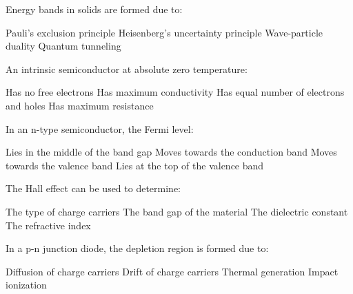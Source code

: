 \begin{question}[2]
Energy bands in solids are formed due to:

\begin{oneparcheckboxes}
\correctchoice Pauli's exclusion principle
\choice Heisenberg's uncertainty principle
\choice Wave-particle duality
\choice Quantum tunneling
\end{oneparcheckboxes}
\end{question}

\begin{question}[2]
An intrinsic semiconductor at absolute zero temperature:

\begin{oneparcheckboxes}
\correctchoice Has no free electrons
\choice Has maximum conductivity
\choice Has equal number of electrons and holes
\choice Has maximum resistance
\end{oneparcheckboxes}
\end{question}

\begin{question}[2]
In an n-type semiconductor, the Fermi level:

\begin{oneparcheckboxes}
\choice Lies in the middle of the band gap
\correctchoice Moves towards the conduction band
\choice Moves towards the valence band
\choice Lies at the top of the valence band
\end{oneparcheckboxes}
\end{question}

\begin{question}[2]
The Hall effect can be used to determine:

\begin{oneparcheckboxes}
\correctchoice The type of charge carriers
\choice The band gap of the material
\choice The dielectric constant
\choice The refractive index
\end{oneparcheckboxes}
\end{question}

\begin{question}[2]
In a p-n junction diode, the depletion region is formed due to:

\begin{oneparcheckboxes}
\correctchoice Diffusion of charge carriers
\choice Drift of charge carriers
\choice Thermal generation
\choice Impact ionization
\end{oneparcheckboxes}
\end{question}

